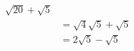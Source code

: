 \documentclass[preview]{standalone}
\begin{document}
\begin{align*}
\sqrt{20} + \sqrt{5} \\&= \sqrt{4}\sqrt{5} + \sqrt{5}\\&= 2\sqrt{5} - \sqrt{5}
\end{align*}
\end{document}
